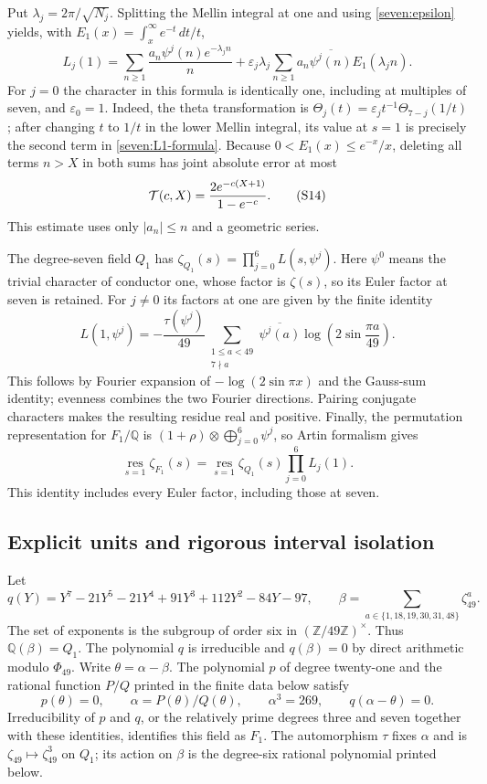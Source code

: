 Put $\lambda_j=2\pi/\sqrt{N_j}$.
Splitting the Mellin integral at one and using
\eqref{seven:epsilon} yields, with
$E_1(x)=\int_x^\infty e^{-t}\,dt/t$,
\[
 L_j(1)=
 \sum_{n\ge1}\frac{a_n\psi^j(n)e^{-\lambda_jn}}{n}
 +\varepsilon_j \lambda_j
 \sum_{n\ge1}a_n\overline{\psi^j(n)}E_1(\lambda_jn).
 \tag{S13}\label{seven:L1-formula}
\]
For $j=0$ the character in this formula is identically one, including at
multiples of seven, and $\varepsilon_0=1$.
Indeed, the theta transformation is
$\Theta_j(t)=\varepsilon_jt^{-1}\Theta_{7-j}(1/t)$; after changing
$t$ to $1/t$ in the lower Mellin integral, its value at $s=1$ is precisely
the second term in \eqref{seven:L1-formula}.
Because $0<E_1(x)\le e^{-x}/x$, deleting all terms $n>X$ in both sums
has joint absolute error at most
\[
 {\cal T}(c,X)=\frac{2e^{-c(X+1)}}{1-e^{-c}}.
 \tag{S14}\label{seven:tail}
\]
This estimate uses only $|a_n|\le n$ and a geometric series.

The degree-seven field $Q_1$ has
$\zeta_{Q_1}(s)=\prod_{j=0}^6L(s,\psi^j)$.
Here $\psi^0$ means the trivial character of conductor one, whose factor is
$\zeta(s)$, so its Euler factor at seven is retained.
For $j\ne0$ its factors at one are given by the finite identity
\[
 L(1,\psi^j)=
 -\frac{\tau(\psi^j)}{49}
 \sum_{\substack{1\le a<49\\7\nmid a}}
       \overline{\psi^j(a)}
       \log\left(2\sin\frac{\pi a}{49}\right).
 \tag{S15}\label{seven:dirichlet-residue}
\]
This follows by Fourier expansion of $-\log(2\sin\pi x)$ and the
Gauss-sum identity; evenness combines the two Fourier directions.
Pairing conjugate characters makes the resulting residue real and positive.
Finally, the permutation representation for $F_1/\mathbb Q$ is
$(1+\rho)\otimes\bigoplus_{j=0}^6\psi^j$, so Artin formalism gives
\[
 \operatorname*{res}_{s=1}\zeta_{F_1}(s)
 =\operatorname*{res}_{s=1}\zeta_{Q_1}(s)
       \prod_{j=0}^6L_j(1).
 \tag{S16}\label{seven:residue-factorization}
\]
This identity includes every Euler factor, including those at seven.

\subsection{Explicit units and rigorous interval isolation}
\label{seven:certification}

Let
\[
 q(Y)=Y^7-21Y^5-21Y^4+91Y^3+112Y^2-84Y-97,
 \qquad
 \beta=\sum_{a\in\{1,18,19,30,31,48\}}\zeta_{49}^{a}.
 \tag{S17}\label{seven:period}
\]
The set of exponents is the subgroup of order six in
$(\mathbb Z/49\mathbb Z)^\times$. Thus $\mathbb Q(\beta)=Q_1$.
The polynomial $q$ is irreducible and $q(\beta)=0$ by direct arithmetic
modulo $\Phi_{49}$.
Write $\theta=\alpha-\beta$. The polynomial $p$ of degree twenty-one and
the rational function $P/Q$ printed in the finite data below satisfy
\[
 p(\theta)=0,\qquad \alpha=P(\theta)/Q(\theta),\qquad
 \alpha^3=269,\qquad q(\alpha-\theta)=0.
 \tag{S18}\label{seven:field-identity}
\]
Irreducibility of $p$ and $q$, or the relatively prime degrees three and
seven together with these identities, identifies this field as $F_1$.
The automorphism $\tau$ fixes $\alpha$ and is
$\zeta_{49}\mapsto\zeta_{49}^3$ on $Q_1$; its action on $\beta$ is the
degree-six rational polynomial printed below.

